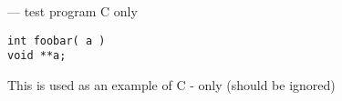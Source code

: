\startmanpage
{}
--- test program C only 
\startvb\begin{verbatim}
int foobar( a )
void **a;
\end{verbatim}
\endvb
This is used as an example of C - only (should be ignored)
\endmanpage
